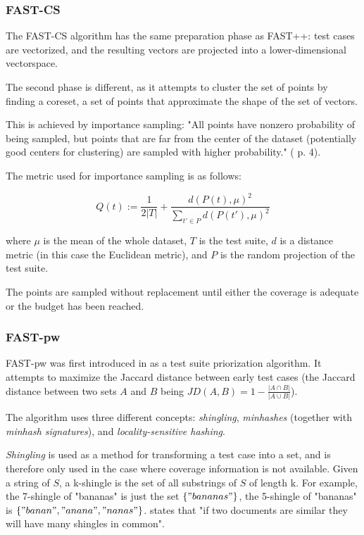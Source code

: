 \subsubsection{FAST-CS}

The FAST-CS algorithm has the same preparation phase as FAST++: test
cases are vectorized, and the resulting vectors are projected into a
lower-dimensional vectorspace.

The second phase is different, as it attempts to cluster the set of
points by finding a coreset, a set of points that approximate the shape
of the set of vectors.

This is achieved by importance sampling: "All points have nonzero
probability of being sampled, but points that are far from the center
of the dataset (potentially good centers for clustering) are sampled
with higher probability." (\cite{cruciani2019scalable} p. 4).

The metric used for importance sampling is as follows:

$$
	Q(t):=\frac{1}{2|T|}+\frac{d(P(t),\mu)^2}{\sum_{t' \in P}d(P(t'),\mu)^2}
$$

where $\mu$ is the mean of the whole dataset, $T$ is the test suite,
$d$ is a distance metric (in this case the Euclidean metric), and $P$
is the random projection of the test suite.

The points are sampled without replacement until either the coverage is
adequate or the budget has been reached.

\subsubsection{FAST-pw}

FAST-pw was first introduced in \cite{miranda2018fast} as a test suite
priorization algorithm. It attempts to maximize the Jaccard distance
between early test cases (the Jaccard distance between two sets $A$
and $B$ being $JD(A, B)=1-\frac{|A \cap B|}{|A \cup B|}$).

The algorithm uses three different concepts: \textit{shingling},
\textit{minhashes} (together with \textit{minhash signatures}), and
\textit{locality-sensitive hashing}.

\textit{Shingling} is used as a method for transforming a test case into
a set, and is therefore only used in the case where coverage information
is not available. Given a string of $S$, a k-shingle is the set of all
substrings of $S$ of length k. For example, the 7-shingle of "bananas"
is just the set $\{"bananas"\}$, the 5-shingle of "bananas" is $\{"banan",
"anana", "nanas"\}$. \cite{miranda2018fast} states that "if two documents
are similar they will have many shingles in common".

